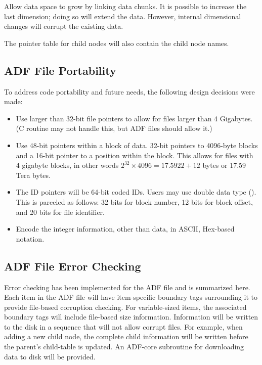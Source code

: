 Allow data space to grow by linking data chunks.
It is possible to increase the last dimension; doing so will extend the
data.
However, internal dimensional changes will corrupt the existing data.

The pointer table for child nodes will also contain the child node names.

\subsection{ADF File Portability}

To address code portability and future needs, the following design
decisions were made:

\begin{itemize}
\item Use larger than 32-bit file pointers to allow for files larger than
      4 Gigabytes.
      (C routine  may not handle this, but ADF files should
      allow it.)
\item Use 48-bit pointers within a block of data.
      32-bit pointers to 4096-byte blocks and a 16-bit pointer to a
      position within the block.
      This allows for files with 4 gigabyte blocks, in other words
      $2^{32} \times 4096 = 17.5922 + 12$ bytes or 17.59 Tera bytes.
\item The ID pointers will be 64-bit coded IDs.
      Users may use double data type ().
      This is parceled as follows: 32 bits for block number, 12 bits for
      block offset, and 20 bits for file identifier.
\item Encode the integer information, other than data, in ASCII,
      Hex-based notation.
\end{itemize}

\subsection{ADF File Error Checking}

Error checking has been implemented for the ADF file and is summarized
here.
Each item in the ADF file will have item-specific boundary tags
surrounding it to provide file-based corruption checking.
For variable-sized items, the associated boundary tags will include
file-based size information.
Information will be written to the disk in a sequence that will not
allow corrupt files.
For example, when adding a new child node, the complete child
information will be written before the parent's child-table is updated.
An ADF-core subroutine for downloading data to disk will be provided.


